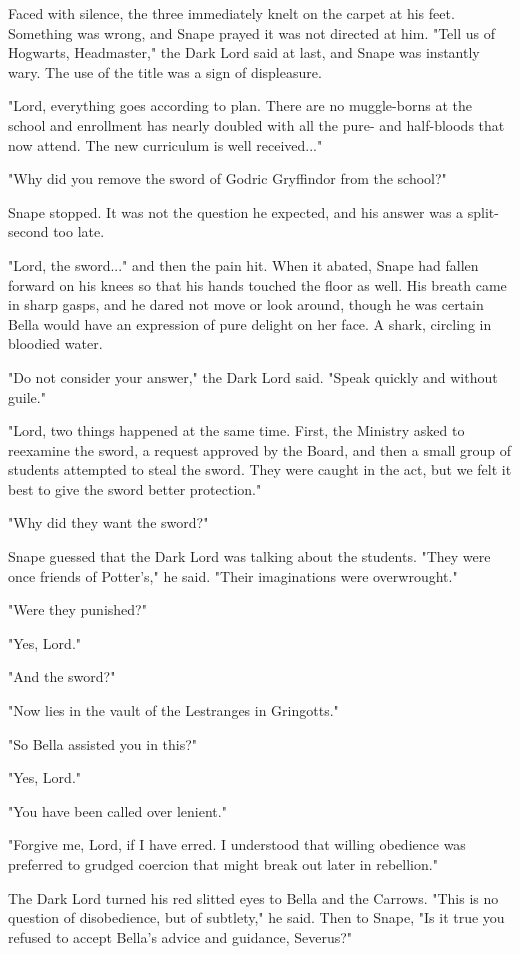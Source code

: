 \documentclass[a4paper,11pt]{article}
\begin{document}
Faced with silence, the three immediately knelt on the carpet at his feet. Something was wrong, and Snape prayed it was not directed at him. "Tell us of Hogwarts, Headmaster," the Dark Lord said at last, and Snape was instantly wary. The use of the title was a sign of displeasure.

"Lord, everything goes according to plan. There are no muggle-borns at the school and enrollment has nearly doubled with all the pure- and half-bloods that now attend. The new curriculum is well received..."

"Why did you remove the sword of Godric Gryffindor from the school?"

Snape stopped. It was not the question he expected, and his answer was a split-second too late.

"Lord, the sword..." and then the pain hit. When it abated, Snape had fallen forward on his knees so that his hands touched the floor as well. His breath came in sharp gasps, and he dared not move or look around, though he was certain Bella would have an expression of pure delight on her face. A shark, circling in bloodied water.

"Do not consider your answer," the Dark Lord said. "Speak quickly and without guile."

"Lord, two things happened at the same time. First, the Ministry asked to reexamine the sword, a request approved by the Board, and then a small group of students attempted to steal the sword. They were caught in the act, but we felt it best to give the sword better protection."

"Why did they want the sword?"

Snape guessed that the Dark Lord was talking about the students. "They were once friends of Potter's," he said. "Their imaginations were overwrought."

"Were they punished?"

"Yes, Lord."

"And the sword?"

"Now lies in the vault of the Lestranges in Gringotts."

"So Bella assisted you in this?"

"Yes, Lord."

"You have been called over lenient."

"Forgive me, Lord, if I have erred. I understood that willing obedience was preferred to grudged coercion that might break out later in rebellion."

The Dark Lord turned his red slitted eyes to Bella and the Carrows. "This is no question of disobedience, but of subtlety," he said. Then to Snape, "Is it true you refused to accept Bella's advice and guidance, Severus?"
\end{document}

